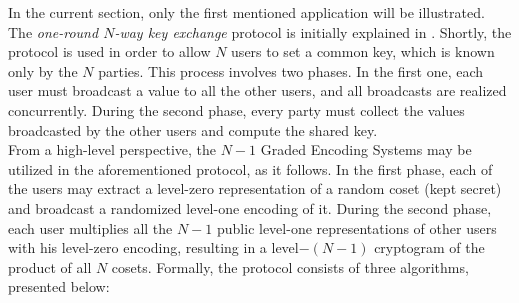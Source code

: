 In the current section, only the first mentioned application will be illustrated. The \textit{one-round $N$-way key exchange} protocol is initially explained in \cite{BoS02}. Shortly, the protocol is used in order to allow $N$ users to set a common key, which is known only by the $N$ parties. This process involves two phases. In the first one, each user must broadcast a value to all the other users, and all broadcasts are realized concurrently. During the second phase, every party must collect the values broadcasted by the other users and compute the shared key. \\

From a high-level perspective, the $N-1$ Graded Encoding Systems may be utilized in the aforementioned protocol, as it follows. In the first phase, each of the users may extract a level-zero representation of a random coset (kept secret) and broadcast a randomized level-one encoding of it. During the second phase, each user multiplies all the $N-1$ public level-one representations of other users with his level-zero encoding, resulting in a level$-(N-1)$ cryptogram of the product of all $N$ cosets. Formally, the protocol consists of three algorithms, presented below:


